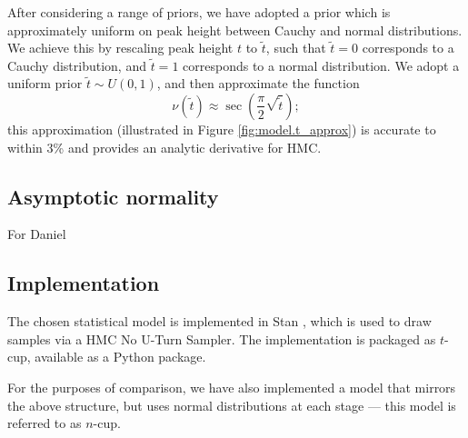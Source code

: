 \documentclass[fleqn,usenatbib]{mnras}
\begin{document}
After considering a range of priors, we have adopted a prior which is
approximately uniform on peak height between Cauchy and normal distributions.
We achieve this by rescaling peak height $t$ to $\tilde{t}$, such that
$\tilde{t} = 0$ corresponds to a Cauchy distribution, and $\tilde{t} = 1$
corresponds to a normal distribution. We adopt a uniform prior $\tilde{t} \sim
U\left(0, 1\right)$, and then approximate the function
\begin{equation}
    \nu\left(\tilde{t}\right)
        \approx
    \sec \left(\frac{\pi}{2} \sqrt{\tilde{t}} \right);
    \label{eqn:model.t_approx}
\end{equation}
this approximation (illustrated in Figure \ref{fig:model.t_approx}) is accurate
to within 3\% and provides an analytic derivative for HMC.

\subsection{Asymptotic normality}
\label{sec:formalism.asymptotic}

{\color{green} For Daniel}

\subsection{Implementation}
\label{sec:formalism.implementation}

The chosen statistical model is implemented in Stan \citep{STAN}, which is used
to draw samples via a HMC No U-Turn Sampler. The implementation is packaged as
$t$-cup, available as a Python package\footnotemark.

For the purposes of comparison, we have also implemented a model that mirrors
the above structure, but uses normal distributions at each stage --- this model
is referred to as $n$-cup.




\end{document}
